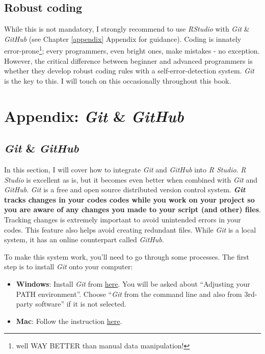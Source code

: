 \documentclass[
]{book}
\begin{document}
\hypertarget{robust-coding}{%
\section{Robust coding}\label{robust-coding}}

While this is not mandatory, I strongly recommend to use \emph{RStudio} with \emph{Git} \& \emph{GitHub} (see Chapter \ref{appendix} Appendix for guidance). Coding is innately error-prone\footnote{well WAY BETTER than manual data manipulation!}; every programmers, even bright ones, make mistakes - no exception. However, the critical difference between beginner and advanced programmers is whether they develop robust coding rules with a self-error-detection system. \emph{Git} is the key to this. I will touch on this occasionally throughout this book.

\hypertarget{appendix-git-github}{%
\chapter{\texorpdfstring{Appendix: \emph{Git} \& \emph{GitHub}}{Appendix: Git \& GitHub}}\label{appendix-git-github}}

\hypertarget{git-github}{%
\section{\texorpdfstring{\emph{Git} \& \emph{GitHub}}{Git \& GitHub}}\label{git-github}}

In this section, I will cover how to integrate \emph{Git} and \emph{GitHub} into \emph{R Studio}. \emph{R Studio} is excellent as is, but it becomes even better when combined with \emph{Git} and \emph{GitHub}. \emph{Git} is a free and open source distributed version control system. \textbf{\emph{Git}} \textbf{tracks changes in your codes codes while you work on your project so you are aware of any changes you made to your script (and other) files}. Tracking changes is extremely important to avoid unintended errors in your codes. This feature also helps avoid creating redundant files. While \emph{Git} is a local system, it has an online counterpart called \emph{GitHub}.

To make this system work, you'll need to go through some processes. The first step is to install \emph{Git} onto your computer:

\begin{itemize}
\item
  \textbf{Windows}: Install \emph{Git} from \href{https://gitforwindows.org/}{here}. You will be asked about ``Adjusting your PATH environment''. Choose ``\emph{Git} from the command line and also from 3rd-party software'' if it is not selected.
\item
  \textbf{Mac}: Follow the instruction \href{https://happygitwithr.com/install-git.html}{here}.
\end{itemize}
\end{document}
